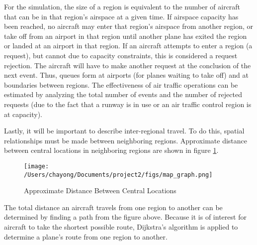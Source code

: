 For the simulation, the size of a region is equivalent to the number of aircraft that can be in
that region’s airspace at a given time. If airspace capacity has been reached, no aircraft may
enter that region’s airspace from another region, or take off from an airport in that region until
another plane has exited the region or landed at an airport in that region. If an aircraft attempts
to enter a region (a request), but cannot due to capacity constraints, this is considered a
request rejection. The aircraft will have to make another request at the conclusion of the next
event. Thus, queues form at airports (for planes waiting to take off) and at boundaries between
regions. The effectiveness of air traffic operations can be estimated by analyzing the total
number of events and the number of rejected requests (due to the fact that a runway is in use or
an air traffic control region is at capacity).

Lastly, it will be important to describe inter-regional travel. To do this, spatial relationships must
be made between neighboring regions. Approximate distance between central locations in
neighboring regions are shown in figure \ref{fig:approx_dist}.

\begin{figure} [htb]
\centering
\texttt{[image: /Users/chayong/Documents/project2/figs/map\_graph.png]}
\caption{Approximate Distance Between Central Locations}
\label{fig:approx_dist}
\end{figure}

The total distance an aircraft travels from one region to another can be determined by finding
a path from the figure above. Because it is of interest for aircraft to take the shortest possible
route, Dijkstra’s algorithm is applied to determine a plane’s route from one region to another.


